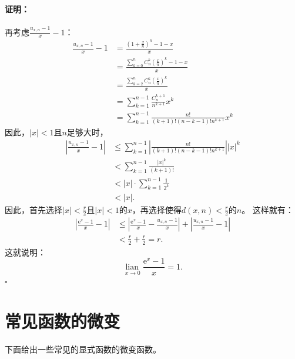 \documentclass[12pt,UTF8]{ctexbook}
\newcommand{\lian}[1]{
    \underset{#1}{\operatorname{lian}\,}
}
\theoremstyle{definition}
\theoremstyle{plain}
\renewenvironment{proof}{\paragraph{\textbf{证明：}}}{\hfill$\square$}
\begin{document}
\begin{appendix}
\begin{proof}
    再考虑$\frac{u_{x,n} - 1}{x} - 1$：
    \begin{align*}
        \frac{u_{x,n} - 1}{x} - 1 &= \frac{\left(1 + \frac{x}{n}\right)^{n} - 1 - x}{x}  \\
        &= \frac{\sum_{k=0}^n C_n^k \left(\frac{x}{n}\right)^k - 1 - x}{x}  \\
        &= \frac{\sum_{k=2}^n C_n^k \left(\frac{x}{n}\right)^k}{x}  \\
        &= \sum_{k=1}^{n-1} \frac{C_n^{k+1}}{n^{k+1}} x^k  \\
        &= \sum_{k=1}^{n-1} \frac{n!}{(k+1)!(n-k-1)!n^{k+1}} x^k  
    \end{align*}
    因此，$|x|<1$且$n$足够大时，
    \begin{align*}
        \left| \frac{u_{x,n} - 1}{x} - 1 \right| &\leqslant \sum_{k=1}^{n-1} \left|\frac{n!}{(k+1)!(n-k-1)!n^{k+1}}\right| |x|^k  \\
        &< \sum_{k=1}^{n-1} \frac{|x|^k}{(k+1)!}  \\
        &< |x| \cdot \sum_{k=1}^{n-1} \frac{1}{2^k}  \\
        &< |x|.  
    \end{align*}
    因此，首先选择$|x| < \frac{r}{2}$且$|x|<1$的$x$，再选择使得$d(x, n) < \frac{r}{2}$的$n$。
    这样就有：
    \begin{align*}
        \left|\frac{\mathrm{e}^x - 1}{x} - 1\right| &\leqslant \left|\frac{\mathrm{e}^x - 1}{x} - \frac{u_{x,n} - 1}{x}\right| + \left|\frac{u_{x,n} - 1}{x} - 1\right|  \\
        &< \frac{r}{2} + \frac{r}{2} = r.   
    \end{align*}
    这就说明：
    $$\lian{x\to 0} \frac{\mathrm{e}^x - 1}{x} = 1.$$
\end{proof}

\section{常见函数的微变}

下面给出一些常见的显式函数的微变函数。


\end{appendix}
\end{document}

